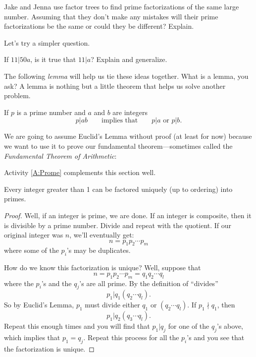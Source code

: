 \begin{question}
Jake and Jenna use factor trees to find prime factorizations of the same large number.  Assuming that they don't make any mistakes will their prime factorizations be the same or could they be different?  Explain.  
\end{question}
\QM

Let's try a simpler question. 

\begin{question} If $11 | 50a$, is it true that $11|a$?  Explain and generalize.  
\end{question}
\QM


The following \textit{lemma} will help us tie these 
ideas together.  What is a lemma, you
ask? A lemma is nothing but a little theorem that helps us solve
another problem.


\begin{lemma} 
If $p$ is a prime number and $a$ and $b$ are integers
\[
p|ab \qquad\text{implies that} \qquad p | a\text{ or } p|b.
\]
\end{lemma}

We are going to assume Euclid's Lemma without proof (at least for now) because we want to use 
it to prove our fundamental theorem---sometimes called the \textit{Fundamental Theorem of Arithmetic}:

\begin{activitynote}
Activity \ref{A:Prome} complements this section well.  %
\end{activitynote}

\begin{theorem}
Every integer greater than 1 can be factored uniquely (up to ordering)
into primes.
\end{theorem}

\begin{proof}
Well, if an integer is prime, we are done. If an integer is composite,
then it is divisible by a prime number. Divide and repeat with the
quotient. If our original integer was $n$, we'll eventually get:
\[
n = p_1p_2 \cdots p_m
\]
where some of the $p_i$'s may be duplicates. 

How do we know this factorization is unique? Well, suppose that
\[
n = p_1p_2 \cdots p_m = q_1q_2\cdots q_l
\]
where the $p_i$'s and the $q_j$'s are all prime. By the
definition of ``divides''
\[
p_1 |q_1(q_2\cdots q_l).
\]
So by Euclid's Lemma, $p_1$ must divide either $q_1$ or $(q_2\cdots q_l)$. 
If $p_1 \nmid q_1$, then 
\[
p_1 |q_2(q_3\cdots q_l).
\]
Repeat this
enough times and you will find that $p_1 | q_j$ for one of the $q_j$'s
above, which implies that $p_1 = q_j$. Repeat this process for all 
the $p_i$'s and you see that the factorization is unique.
\end{proof}

